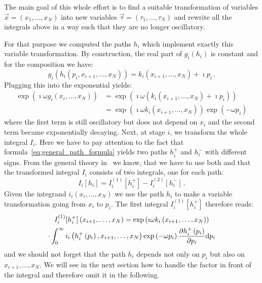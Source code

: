 \documentclass[a4paper,10pt]{article}
\begin{document}
The main goal of this whole effort is to find a suitable transformation of
variables $\vec{x} = \left(x_1,\ldots,x_N\right)$ into new
variables $\vec{\tau} = \left(\tau_1,\ldots,\tau_N\right)$ and
rewrite all the integrals above in a way such that they are no longer
oscillatory.

For that purpose we computed the paths $h_i$ which implement exactly
this variable transformation. By construction, the real part of
$g_i\left(h_i\right)$ is constant and for the composition we have:
\begin{equation}
  g_i\left(h_i\left(p_i, x_{i+1},\ldots,x_N\right)\right)
  = k_i\left(x_{i+1},\ldots,x_N\right)
  + \imath p_i \,.
\end{equation}
Plugging this into the exponential yields:
\begin{equation}
\begin{split}
  \exp\left(\imath \omega g_i\left(x_i,\ldots,x_N\right)\right)
  & = \exp\left(\imath \omega \left(k_i\left(x_{i+1},\ldots,x_N\right) + \imath p_i\right)\right) \\
  & = \exp\left(\imath \omega k_i\left(x_{i+1},\ldots,x_N\right)\right)
      \exp\left(- \omega p_i\right)
\end{split}
\end{equation}
where the first term is still oscillatory but does not depend on $x_i$
and the second term became exponentially decaying. Next, at stage $i$, we
transform the whole integral $I_i$. Here we have to pay attention to the
fact that formula~\eqref{eq:general_path_formula} yields two paths $h_i^{+}$
and $h_i^{-}$ with different signs. From the general theory in~\cite{AH_cgq}
we know, that we have to use both and that the transformed integral $I_i$
consists of two integrals, one for each path:
\begin{equation}
  I_i[h_i] = I_i^{(1)}[h_i^{+}] - I_i^{(2)}[h_i^{-}] \,.
\end{equation}
Given the integrand $i_i(x_i, \ldots, x_N)$ we use the path $h_i$
to make a variable transformation going from $x_i$ to $p_i$. The first
integral $I_i^{(1)}[h_i^{+}]$ therefore reads:
\begin{multline}
  I_i^{(1)}[h_i^{+}]\left(x_{i+1},\ldots,x_N\right) =
  \exp\left(\imath \omega k_i\left(x_{i+1},\ldots,x_N\right)\right)
  \\
  \cdot
  \int_0^\infty
    i_i\left(h_i^{+}\left(p_i\right), x_{i+1},\ldots,x_N\right)
    \exp\left(- \omega p_i\right)
    \frac{\partial h_i^{+}\left(p_i\right)}{\partial p_i}
  \mathrm{d}p_i
\end{multline}
and we should not forget that the path $h_i$ depends not only
on $p_i$ but also on $x_{i+1},\ldots,x_N$. We will see in the
next section how to handle the factor in front of the integral
and therefore omit it in the following.
\end{document}
